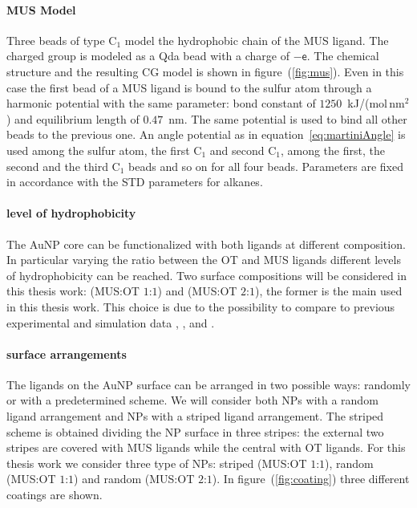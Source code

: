 \paragraph{\textbf{MUS Model}} Three \martini{} beads of type C$_1$ model the hydrophobic chain of the \ac{MUS} 
ligand. The charged group is modeled as a Qda bead with a charge of $-\mathsf{e}$. The chemical structure and the 
resulting \ac{CG} \martini{} model is shown in figure~(\ref{fig:mus}). Even in this case the first bead of a 
\ac{MUS} ligand is bound to the sulfur atom through a harmonic potential with the same parameter: bond constant 
of $1250$~kJ/(mol\,nm$^2$) and equilibrium length of $0.47$~nm. The same potential is used to bind all other 
beads to the previous one. An angle potential as in equation~\eqref{eq:martiniAngle} is used among the sulfur 
atom, the first C$_1$ and second C$_1$, among the first, the second and the third C$_1$ beads and so on for all 
four beads. Parameters are fixed in accordance with the \ac{STD} \martini{} parameters for alkanes.

\paragraph{\textbf{level of hydrophobicity}} The \ac{AuNP} core can be functionalized with both ligands at 
different composition. In particular varying the ratio between the \ac{OT} and \ac{MUS} ligands different levels 
of hydrophobicity can be reached. Two surface compositions will be considered in this thesis work: 
(\ac{MUS}:\ac{OT} $1$:$1$) and (\ac{MUS}:\ac{OT} $2$:$1$), the former is the main used in this thesis work. This 
choice is due to the possibility to compare to previous experimental and simulation data \cite{Maccarini2013}, 
\cite{VanLehn2013}, \cite{VanLehn2014} and \cite{VanLehn2015}.

\paragraph{\textbf{surface arrangements}} The ligands on the \ac{AuNP} surface can be arranged in two possible 
ways: randomly or with a predetermined scheme. We will consider both \acp{NP} with a random ligand arrangement 
and \acp{NP} with a striped ligand arrangement. The striped scheme is obtained dividing the \ac{NP} surface in 
three stripes: the external two stripes are covered with \ac{MUS} ligands while the central with \ac{OT} ligands. 
For this thesis work we consider three type of \acp{NP}: striped (\ac{MUS}:\ac{OT} $1$:$1$), random 
(\ac{MUS}:\ac{OT} $1$:$1$) and random (\ac{MUS}:\ac{OT} $2$:$1$). In figure~(\ref{fig:coating}) three different 
coatings are shown.

